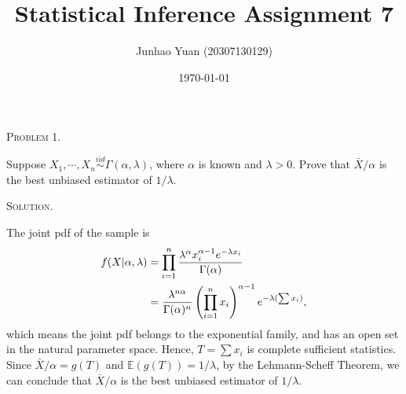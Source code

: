 \documentclass{article}
\title{\textbf{Statistical Inference Assignment 7}}
\author{Junhao Yuan (20307130129)}
\date{\today}
\begin{document}
\begin{CJK}{UTF8}{gbsn}

    \maketitle
    \def \RR{{\mathbb R}}
    \def \EE{{\mathbb E}}
    \def \VV{{\mathbb V}}
    \def \II{{\mathbb I}}
    \def \NN{{\mathcal N}}


    \begin{shaded}
        \noindent\textsc{Problem 1.}\par
        Suppose $X_1, \cdots, X_n \mathop{\sim}\limits^{iid} \Gamma(\alpha, \lambda)$, where $\alpha$ is known
        and $\lambda > 0$. Prove that $\bar{X}/\alpha$ is the best unbiased estimator of $1/\lambda$.
    \end{shaded}
    \noindent\textsc{Solution.}\par
    The joint pdf of the sample is
    \begin{align}
        f(X| \alpha, \lambda) & = \prod_{i=1}^n \frac{\lambda^{\alpha}x_i^{\alpha - 1}e^{-\lambda x_i}}{\Gamma(\alpha)} \notag                            \\
                              & = \frac{\lambda^{n\alpha}}{\Gamma(\alpha)^n }\left (\prod_{i=1}^n x_i\right )^{\alpha - 1}e^{-\lambda (\sum x_i)}, \notag
    \end{align}
    which means the joint pdf belongs to the exponential family, and has an open set in the natural parameter space.
    Hence, $T=\sum x_i$ is complete sufficient statistics.
    Since $\bar{X}/\alpha = g(T)$ and $\EE(g(T)) = 1/\lambda$, by the Lehmann-Scheff Theorem, we can conclude
    that $\bar{X}/\alpha$ is the best unbiased estimator of $1/\lambda$.






\end{CJK}
\end{document}
